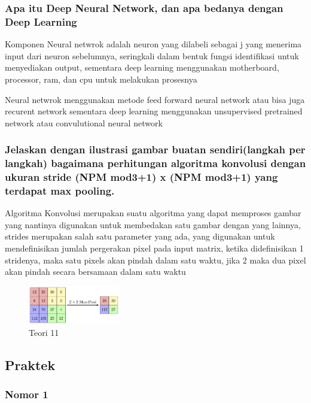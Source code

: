 \subsubsection{Apa itu Deep Neural Network, dan apa bedanya dengan Deep Learning}
\hfill\break
Komponen Neural netwrok adalah neuron yang dilabeli sebagai j yang menerima input dari neuron sebelumnya, seringkali dalam bentuk fungsi identifikasi untuk menyediakan output, sementara deep learning menggunakan motherboard, processor, ram, dan cpu untuk melakukan prosesnya

Neural netwrok menggunakan metode feed forward neural network atau bisa juga recurent network sementara deep learning menggunakan unsupervised pretrained network atau convulutional neural network

\subsubsection{Jelaskan dengan ilustrasi gambar buatan sendiri(langkah per langkah) bagaimana perhitungan algoritma konvolusi dengan ukuran stride (NPM mod3+1) x (NPM mod3+1) yang terdapat max pooling.}	
\hfill\break
Algoritma Konvolusi  merupakan suatu algoritma yang dapat memproses gambar yang nantinya digunakan untuk membedakan satu gambar dengan yang lainnya, strides merupakan salah satu parameter yang ada, yang digunakan untuk mendefinisikan jumlah pergerakan pixel pada input matrix, ketika didefinisikan 1 stridenya, maka satu pixels akan pindah dalam satu waktu, jika 2 maka dua pixel akan pindah secara bersamaan dalam satu waktu
\begin{figure}[H]
\centering
	\includegraphics[width=4cm]{figures/1174079/7/MaxpoolSample.png}
\caption{Teori 11}
\end{figure}



\subsection{Praktek}
\subsubsection{Nomor 1}
\hfill\break



